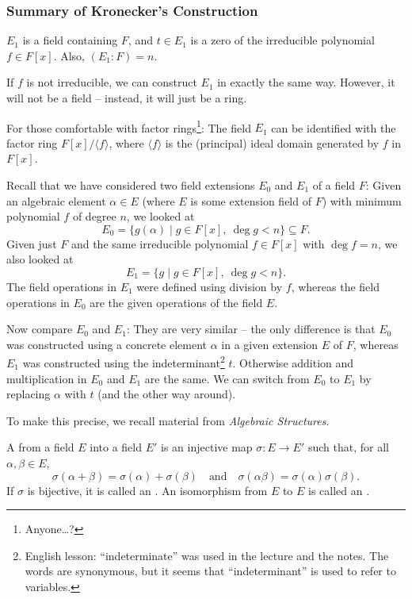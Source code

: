 \subsubsection{Summary of Kronecker's Construction}
$E_1$ is a field containing $F$, and $t \in E_1$ is a zero of the irreducible polynomial $f \in F[x]$. Also, $(E_1 : F) = n$.

\begin{note}
	If $f$ is not irreducible, we can construct $E_1$ in exactly the same way. However, it will not be a field -- instead, it will just be a ring.
	
	For those comfortable with factor rings\footnote{Anyone\dots?}: The field $E_1$ can be identified with the factor ring $F[x] / \langle f \rangle$, where $\langle f \rangle$ is the (principal) ideal domain generated by $f$ in $F[x]$.
\end{note}

Recall that we have considered two field extensions $E_0$ and $E_1$ of a field $F$: Given an algebraic element $\alpha \in E$ (where $E$ is some extension field of $F$) with minimum polynomial $f$ of degree $n$, we looked at
\[
	E_0 = \{g(\alpha) \mid g \in F[x],\ \deg{g} < n\} \subseteq F.
\]
Given just $F$ and the same irreducible polynomial $f \in F[x]$ with $\deg{f} = n$, we also looked at
\[
	E_1 = \{g \mid g \in F[x],\ \deg{g} < n\}.
\]
The field operations in $E_1$ were defined using division by $f$, whereas the field operations in $E_0$ are the given operations of the field $E$.

Now compare $E_0$ and $E_1$: They are very similar -- the only difference is that $E_0$ was constructed using a concrete element $\alpha$ in a given extension $E$ of $F$, whereas $E_1$ was constructed using the indeterminant\footnote{English lesson: ``indeterminate'' was used in the lecture and the notes. The words are synonymous, but it seems that ``indeterminant'' is used to refer to variables.} $t$. Otherwise addition and multiplication in $E_0$ and $E_1$ are the same. We can switch from $E_0$ to $E_1$ by replacing $\alpha$ with $t$ (and the other way around).

To make this precise, we recall material from \emph{Algebraic Structures}.

\begin{definition}\label{def:mono-iso-auto-morphism}
	A  from a field $E$ into a field $E'$ is an injective map $\sigma : E \to E'$ such that, for all $\alpha, \beta \in E$,
	\[
		\sigma(\alpha + \beta) = \sigma(\alpha) + \sigma(\beta) \quad \text{and} \quad \sigma(\alpha \beta) = \sigma(\alpha)\sigma(\beta).
	\]
	If $\sigma$ is bijective, it is called an . An isomorphism from $E$ to $E$ is called an .
\end{definition}

